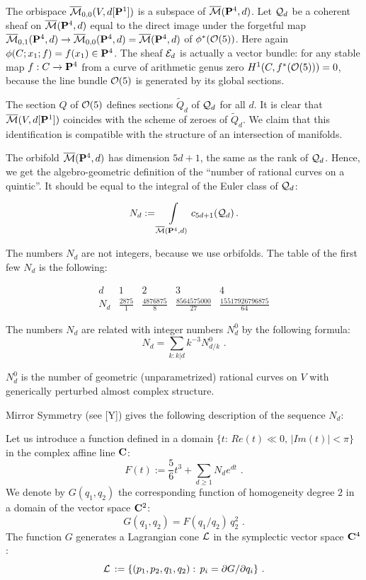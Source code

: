 \documentclass{amsart}
\begin{document}
The orbispace $\M_{0,0}(V,d[\P^1])$ is a subspace of $\M(\P^4,d)$.
  Let $\E_d$ be a coherent sheaf on $\M(\P^4,d)$
 equal to the direct image under the forgetful map
 $\M_{0,1}(\P^4,d)\to\M_{0,0}(\P^4,d)=\M(\P^4,d)$ of $\phi^*(\O(5))$.
  Here again $\phi(C;x_1;f)=f(x_1)\in \P^4$.
 The sheaf $\Cal E_d$ is actually a vector bundle:
  for any stable map $f:C\to\P^4$ from a curve of arithmetic genus zero
$H^1(C,f^*(\O(5)))=0$, because the line bundle $\O(5)$ is generated by its
global sections.

The section $Q$ of $\O(5)$ defines sections $\widetilde{Q}_d$ of
$\E_d$ for all $d$. It is clear that $\M(V,d[\P^1])$ coincides with the scheme
of zeroes of $\widetilde{Q}_d$.
 We claim that this identification is compatible with the structure of an
intersection of manifolds.

The orbifold $\M(\P^4,d)$ has dimension $5d+1$, the same as the
rank of $\E_d$. Hence, we get the algebro-geometric definition
 of the ``number of rational curves on a quintic''. It should be equal to the
integral of the Euler class of $\E_d$:

$$N_d:=\int\limits_{\M(\P^4,d)}c_{5d+1}(\E_d)\,.$$

The numbers $N_d$ are not integers, because we use orbifolds.
The table of the first few $N_d$ is the following:


$$\begin{matrix}
d& 1 &2 &3 &4\\
N_d &
\frac{2875}{1}&\frac{4876875}{8}&\frac{8564575000}{27}&\frac{15517926796875}{64}\end{matrix}$$

The numbers $N_d$ are related with integer numbers $N_d^0$
 by the following formula:
$$N_d=\sum_{k:k|d}k^{-3}N^0_{d/k}\,\,.$$

$N^0_d$ is the number of geometric (unparametrized) rational curves
on $V$ with generically perturbed almost complex structure.


Mirror Symmetry (see [Y]) gives the following description of the sequence
$N_d$:

Let us introduce a function defined in a domain $\{t:\,Re(t)\ll 0,\,|Im(t)|<
\pi\}$ in the complex affine line
 $\C$:
$$F(t):=\frac{5}{6}t^3+\sum_{d\ge 1} N_d e^{dt}\,\,.$$
 We denote by $G(q_1,q_2)$ the corresponding function of homogeneity
 degree $2$ in a domain of the vector space $\C^2$:
 $$G(q_1,q_2)=F(q_1/q_2)\,q_2^2\,\,.$$
  The function $G$ generates a Lagrangian cone $\Cal L$ in the symplectic
vector space $\C^4$:
$$\Cal L\,:=\{(p_1,p_2,q_1,q_2):\,p_i=\partial G/\partial q_i\}\,\,.$$
\end{document}
